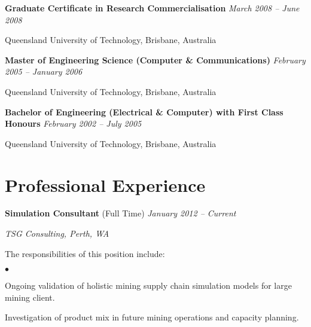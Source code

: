 \documentclass[margin,line]{resume}
\newenvironment{list1}{
  \begin{list}{}{%
      \setlength{\itemsep}{0in}
      \setlength{\parsep}{0in} \setlength{\parskip}{0in}
      \setlength{\topsep}{0in} \setlength{\partopsep}{0in}
      \setlength{\leftmargin}{0.17in}}}{\end{list}}
\newenvironment{list2}{
  \begin{list}{$\bullet$}{%
      \setlength{\itemsep}{0in}
      \setlength{\parsep}{0in} \setlength{\parskip}{0in}
      \setlength{\topsep}{0in} \setlength{\partopsep}{0in}
      \setlength{\leftmargin}{0.2in}}}{\end{list}}
\begin{document}
\begin{resume}
{\bf Graduate Certificate in Research Commercialisation} \hfill {\it March 2008 -- June 2008}\\\vspace{-0.85\baselineskip}
\begin{list1}
\item[] Queensland University of Technology, Brisbane, Australia
\end{list1}

{\bf Master of Engineering Science (Computer \& Communications)} \hfill {\it February 2005 -- January 2006}\\\vspace{-0.85\baselineskip}
\begin{list1}
\item[] Queensland University of Technology, Brisbane, Australia
\end{list1}

{\bf Bachelor of Engineering (Electrical \& Computer) with First Class Honours} \hfill {\it February 2002 -- July 2005} \\\vspace{-0.85\baselineskip}
\begin{list1}
\item[] Queensland University of Technology, Brisbane, Australia
\end{list1}

\section{\sc Professional Experience}
{\textbf{Simulation Consultant} (Full Time)} \hfill {\it January 2012 -- Current}\\
\vspace{-0.85\baselineskip}
\begin{list1}
\item {\it TSG Consulting, Perth, WA}
\item The responsibilities of this position include:
\begin{list2}
\item Ongoing validation of holistic mining supply chain simulation models for large mining client.
\item Investigation of product mix in future mining operations and capacity planning.
\end{list2}
\end{list1}


\end{resume}
\end{document}
